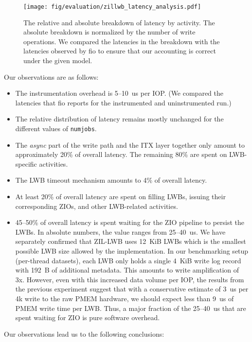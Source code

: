 \documentclass[12pt,a4paper,twoside]{book}
\begin{document}
\begin{figure}[H]
    \centering
    \texttt{[image: fig/evaluation/zillwb\_latency\_analysis.pdf]}
    \caption{The relative and absolute breakdown of latency by activity.
    The absolute breakdown is normalized by the number of write operations.
    We compared the latencies in the breakdown with the latencies observed by fio to ensure that our accounting is correct under the given model.
    }
    \label{fig:lwbanalysis:breakdown_charts}
\end{figure}

Our observations are as follows:
\begin{itemize}[noitemsep]
    \item The instrumentation overhead is 5--10~us per IOP. (We compared the latencies that fio reports for the instrumented and uninstrumented run.)
    \item The relative distribution of latency remains mostly unchanged for the different values of \lstinline{numjobs}.
    \item The \textit{async} part of the write path and the ITX layer together only amount to approximately 20\% of overall latency.
        The remaining 80\% are spent on LWB-specific activities.
    \item The LWB timeout mechanism amounts to 4\% of overall latency.
    \item At least 20\% of overall latency are spent on filling LWBs, issuing their corresponding ZIOs, and other LWB-related activities.
    \item 45--50\% of overall latency is spent waiting for the ZIO pipeline to persist the LWBs.
        In absolute numbers, the value ranges from 25--40~us.
        We have separately confirmed that ZIL-LWB uses 12~KiB LWBs which is the smallest possible LWB size allowed by the implementation.
        In our benchmarking setup (per-thread datasets), each LWB only holds a single 4~KiB write log record with 192~B of additional metadata.
        This amounts to write amplification of 3x.
        However, even with this increased data volume per IOP, the results from the previous experiment suggest that with a conservative estimate of 3~us per 4k write to the raw PMEM hardware, we should expect less than 9~us of PMEM write time per LWB.
        Thus, a major fraction of the 25--40~us that are spent waiting for ZIO is pure software overhead.
\end{itemize}

Our observations lead us to the following conclusions:
\end{document}
